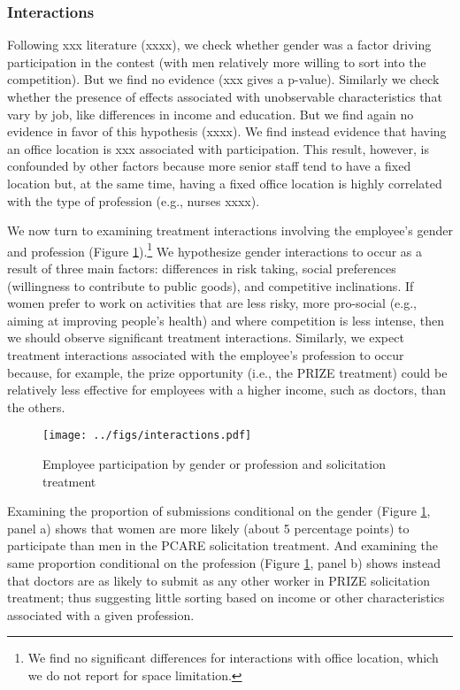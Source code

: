 \documentclass[11pt, titlepage]{article}
\begin{document}
\subsubsection{Interactions}\label{interactions}

Following xxx literature (xxxx), we check whether gender was a factor
driving participation in the contest (with men relatively more willing
to sort into the competition). But we find no evidence (xxx gives a
p-value). Similarly we check whether the presence of effects associated
with unobservable characteristics that vary by job, like differences in
income and education. But we find again no evidence in favor of this
hypothesis (xxxx). We find instead evidence that having an office
location is xxx associated with participation. This result, however, is
confounded by other factors because more senior staff tend to have a
fixed location but, at the same time, having a fixed office location is
highly correlated with the type of profession (e.g., nurses xxxx).

We now turn to examining treatment interactions involving the employee's
gender and profession (Figure \ref{interactions}).\footnote{We find no
  significant differences for interactions with office location, which
  we do not report for space limitation.} We hypothesize gender
interactions to occur as a result of three main factors: differences in
risk taking, social preferences (willingness to contribute to public
goods), and competitive inclinations. If women prefer to work on
activities that are less risky, more pro-social (e.g., aiming at
improving people's health) and where competition is less intense, then
we should observe significant treatment interactions. Similarly, we
expect treatment interactions associated with the employee's profession
to occur because, for example, the prize opportunity (i.e., the PRIZE
treatment) could be relatively less effective for employees with a
higher income, such as doctors, than the others.

\begin{figure} 
\caption{Employee participation by gender or profession and solicitation treatment}
  \label{interactions}
  \centering
  \texttt{[image: ../figs/interactions.pdf]}
\end{figure}

Examining the proportion of submissions conditional on the gender
(Figure \ref{interactions}, panel a) shows that women are more likely
(about 5 percentage points) to participate than men in the PCARE
solicitation treatment. And examining the same proportion conditional on
the profession (Figure \ref{interactions}, panel b) shows instead that
doctors are as likely to submit as any other worker in PRIZE
solicitation treatment; thus suggesting little sorting based on income
or other characteristics associated with a given profession.
\end{document}
